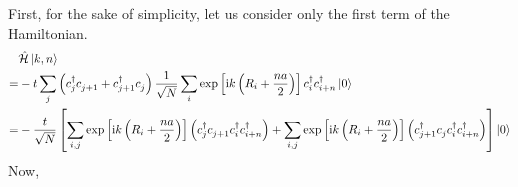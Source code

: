 \documentclass[a4paper, 11pt]{report}
\newcommand{\I}{\mathrm{i}}
\begin{document}
First, for the sake of simplicity, let us consider only the first term of the Hamiltonian.
\begin{displaymath}
\begin{split}
&\hat{\mathcal{H}} \ket{k, n}\\ 
=& -t \sum_{j}\left( c^{\dagger}_{j} c^{}_{j + 1} + c^{\dagger}_{j + 1} c^{}_{j} \right)  \frac{1}{\sqrt{N}} \sum_{i}\exp\left[ \I k \left( R_i + \frac{n a}{2}\right) \right]  c^{\dagger}_{i} c^{\dagger}_{i + n} \ket{0}\\
=& -\frac{t}{\sqrt{N}} \left[ \sum_{i,j}\exp\left[\I k \left(R_i + \frac{na}{2}\right)\right]\left(c^{\dagger}_{j} c^{}_{j+1} c^{\dagger}_{i} c^{\dagger}_{i + n} \right) + \sum_{i,j}\exp\left[\I k \left(R_i + \frac{na}{2}\right)\right]\left(c^{\dagger}_{j + 1} c^{}_{j} c^{\dagger}_{i} c^{\dagger}_{i + n} \right) \right]\ket{0}
\end{split}
\end{displaymath}
Now,
\end{document}
